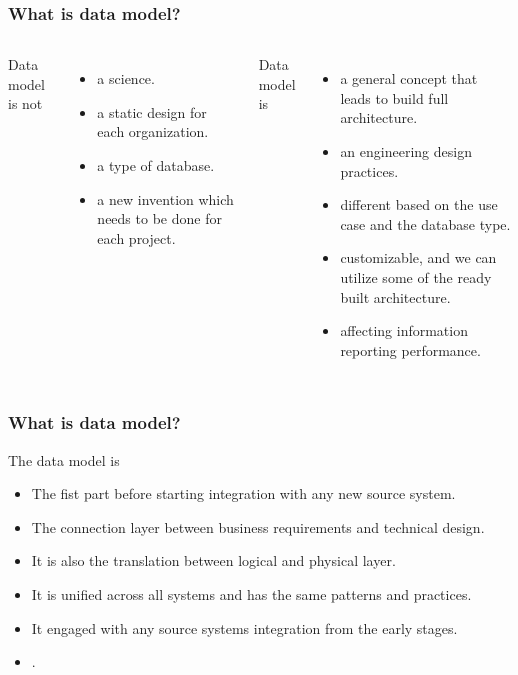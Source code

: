 \begin{frame}
    \frametitle{What is data model?}

    \begin{columns}

        Data model is not
        \begin{itemize}[<+->]
            \item a science.
            \item a static design for each organization.
            \item a type of database.
            \item a new invention which needs to be done for each project.
        \end{itemize}


        Data model is
        \begin{itemize}[<+->]
            \item a general concept that leads to build full architecture.
            \item an engineering design practices.
            \item different based on the use case and the database type.
            \item customizable, and we can utilize some of the ready built architecture.
            \item affecting information reporting performance.
        \end{itemize}

    \end{columns}

\end{frame}


\begin{frame}
    \frametitle{What is data model?}
    The data model is
    \begin{itemize}[<+->]
        \item The fist part before starting integration with any new source system.
        \item The connection layer between business requirements and technical design.
        \item It is also the translation between logical and physical layer.
        \item It is unified across all systems and has the same patterns and practices.
        \item It engaged with any source systems integration from the early stages.
        \item {}.
    \end{itemize}
\end{frame}

